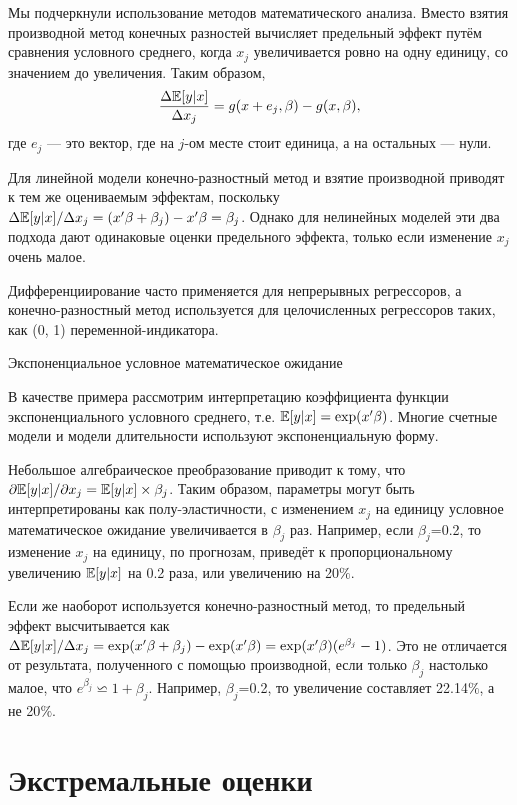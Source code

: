 Мы подчеркнули использование методов математического анализа. Вместо взятия производной метод конечных разностей вычисляет предельный эффект путём сравнения условного среднего, когда $x_j$ увеличивается ровно на одну единицу, со значением до увеличения. Таким образом,
\[
\frac{\Delta \mathbb{E}[y|x]}{ \Delta x_j}=g(x+e_j,\beta)-g(x,\beta),
\]
где $e_j$ --- это вектор, где на $j$-ом месте стоит единица, а на остальных --- нули.

Для линейной модели конечно-разностный метод и взятие производной приводят к тем же оцениваемым эффектам, поскольку $\Delta \mathbb{E}[y|x] / \Delta x_j = (x'\beta + \beta_j)-x'\beta = \beta_j$. Однако для нелинейных моделей эти два подхода дают одинаковые оценки предельного эффекта, только если изменение $x_j$ очень малое.

Дифференциирование часто применяется для непрерывных регрессоров, а конечно-разностный метод используется для целочисленных регрессоров таких, как (0, 1) переменной-индикатора.

\begin{center}
Экспоненциальное условное математическое ожидание
\end{center}

В качестве примера рассмотрим интерпретацию коэффициента функции экспоненциального условного среднего, т.е. $\mathbb{E}[y|x]= \exp(x'\beta)$. Многие счетные модели и модели длительности используют экспоненциальную форму.

Небольшое алгебраическое преобразование приводит к тому, что $\partial \mathbb{E}[y|x] / \partial x_j=\mathbb{E}[y|x]\times \beta_j$. Таким образом, параметры могут быть интерпретированы как полу-эластичности, с изменением $x_j$ на единицу условное математическое ожидание увеличивается в $\beta_j$ раз. Например, если $\beta_j$=0.2, то изменение $x_j$ на единицу, по прогнозам, приведёт к пропорциональному увеличению $\mathbb{E}[y|x]$ на 0.2 раза, или увеличению на 20$\%$.

Если же наоборот используется конечно-разностный метод, то предельный эффект высчитывается как $\Delta \mathbb{E}[y|x] / \Delta x_j = \exp(x'\beta + \beta_j)-\exp(x'\beta) = \exp(x'\beta)(e^{\beta_j}-1)$. Это не отличается от результата, полученного с помощью производной, если только $\beta_j$ настолько малое, что $e^{\beta_j} \backsimeq 1+\beta_j$. Например,  $\beta_j$=0.2, то увеличение составляет 22.14$\%$, а не 20$\%$.

\section{Экстремальные оценки}

